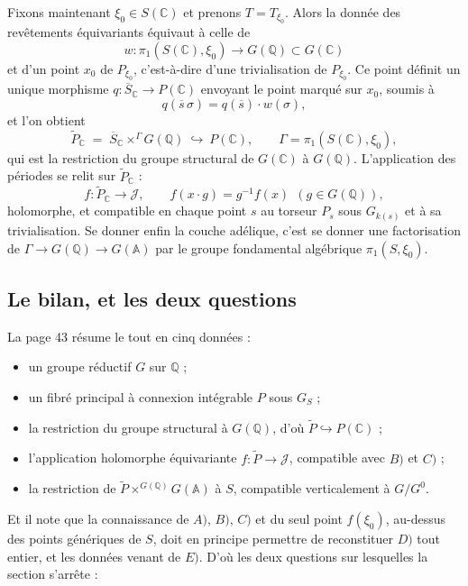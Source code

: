 \documentclass[11pt,a4paper]{article}
\begin{document}
Fixons maintenant $\xi_{0} \in S(\mathbb{C})$ et prenons $T = T_{\xi_{0}}$.
Alors la donnée des revêtements équivariants équivaut à celle de
\[
w : \pi_{1}(S(\mathbb{C}), \xi_{0}) \longrightarrow G(\mathbb{Q}) \subset G(\mathbb{C})
\]
et d'un point $x_{0}$ de $P_{\xi_{0}}$, c'est-à-dire d'une trivialisation de
$P_{\xi_{0}}$. Ce point définit un unique morphisme
$q : \overline{S}_{\mathbb{C}} \to P(\mathbb{C})$ envoyant le point marqué sur
$x_{0}$, soumis à
\[
q(\overline{s}\,\sigma) = q(\overline{s}) \cdot w(\sigma) ,
\]
et l'on obtient
\[
\widetilde{P}_{\mathbb{C}} \;=\; \overline{S}_{\mathbb{C}} \times^{\Gamma} G(\mathbb{Q})
\ \hookrightarrow\ P(\mathbb{C}) , \qquad \Gamma = \pi_{1}(S(\mathbb{C}), \xi_{0}) ,
\]
qui est la restriction du groupe structural de $G(\mathbb{C})$ à
$G(\mathbb{Q})$. L'application des périodes se relit sur
$\widetilde{P}_{\mathbb{C}}$ :
\[
f : \widetilde{P}_{\mathbb{C}} \longrightarrow \mathcal{J} ,
\qquad f(x \cdot g) = g^{-1} f(x) \ \ (g \in G(\mathbb{Q})) ,
\]
holomorphe, et compatible en chaque point $s$ au torseur $P_{s}$ sous
$G_{k(s)}$ et à sa trivialisation. Se donner enfin la couche adélique, c'est se
donner une factorisation de $\Gamma \to G(\mathbb{Q}) \to G(\mathbb{A})$ par le
groupe fondamental algébrique $\pi_{1}(S, \xi_{0})$.

\subsection*{Le bilan, et les deux questions}

La page 43 résume le tout en cinq données :

\begin{itemize}
  \item[$A)$] un groupe réductif $G$ sur $\mathbb{Q}$ ;
  \item[$B)$] un fibré principal à connexion intégrable $P$ sous $G_{S}$ ;
  \item[$C)$] la restriction du groupe structural à $G(\mathbb{Q})$, d'où
  $\widetilde{P} \hookrightarrow P(\mathbb{C})$ ;
  \item[$D)$] l'application holomorphe équivariante $f : \widetilde{P} \to
  \mathcal{J}$, compatible avec $B)$ et $C)$ ;
  \item[$E)$] la restriction de $\widetilde{P} \times^{G(\mathbb{Q})}
  G(\mathbb{A})$ à $S$, compatible verticalement à $G/G^{0}$.
\end{itemize}

Et il note que la connaissance de $A)$, $B)$, $C)$ et du seul point
$f(\xi_{0})$, au-dessus des points génériques de $S$, doit en principe
permettre de reconstituer $D)$ tout entier, et les données venant de $E)$.
D'où les deux questions sur lesquelles la section s'arrête :
\end{document}
